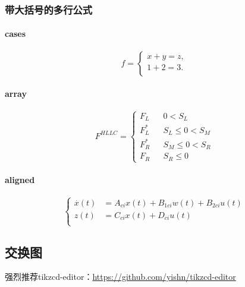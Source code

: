 \subsubsection{带大括号的多行公式}
\paragraph{cases}
$$
    f=
    \begin{cases}
      x + y = z,  \\
      1 + 2 = 3.  \\
    \end{cases}
$$

\paragraph{array}
$$ F^{HLLC}=\left\{
\begin{array}{rcl}
F_L       &      & {0      <      S_L}\\
F^*_L     &      & {S_L \leq 0 < S_M}\\
F^*_R     &      & {S_M \leq 0 < S_R}\\
F_R       &      & {S_R \leq 0}
\end{array} \right. $$
    
\paragraph{aligned}
\begin{equation}
    \left\{
     \begin{aligned}
     \overset{.}x(t) &=A_{ci}x(t)+B_{1ci}w(t)+B_{2ci}u(t)  \\
     z(t) &=C_{ci}x(t)+D_{ci}u(t) \\
     \end{aligned}
     \right.
\end{equation}

\subsection{交换图}
\begin{sloppypar}
强烈推荐tikzcd-editor：\url{https://github.com/yishn/tikzcd-editor}
\end{sloppypar}

\begin{center}
\end{center}

